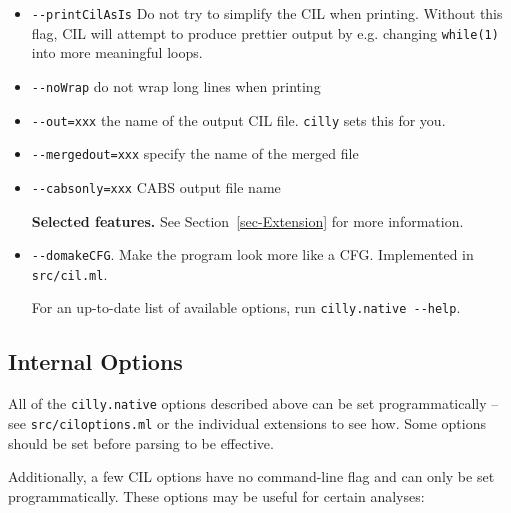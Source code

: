 \documentclass[letterpaper]{article}
\def\secref#1{Section~\ref{sec-#1}}
\def\t#1{{\tt #1}}
\begin{document}
\begin{itemize}
  {\bf Output Options:}
  \item \t{-{}-printCilAsIs} Do not try to simplify the CIL when
  printing.  Without this flag, CIL will attempt to produce prettier
  output by e.g. changing \t{while(1)} into more meaningful loops.
  \item \t{-{}-noWrap} do not wrap long lines when printing
  \item \t{-{}-out=xxx} the name of the output CIL file.  \t{cilly}
  sets this for you.
  \item \t{-{}-mergedout=xxx} specify the name of the merged file
  \item \t{-{}-cabsonly=xxx} CABS output file name

  {\bf Selected features.}  See \secref{Extension} for more information.
\item \t{-{}-domakeCFG}. Make the program look more like a CFG. Implemented
in \t{src/cil.ml}.

For an up-to-date list of available options, run \t{cilly.native -{}-help}.

\end{itemize}

\subsection{Internal Options}
\label{sec-cilly-internal-options}

All of the \t{cilly.native} options described above can be set
programmatically -- see \t{src/ciloptions.ml} or the individual
extensions to see how.  Some options should be set before parsing to
be effective.

Additionally, a few CIL options have no command-line flag and can only
be set programmatically.  These options may be useful for certain
analyses:
\end{document}
